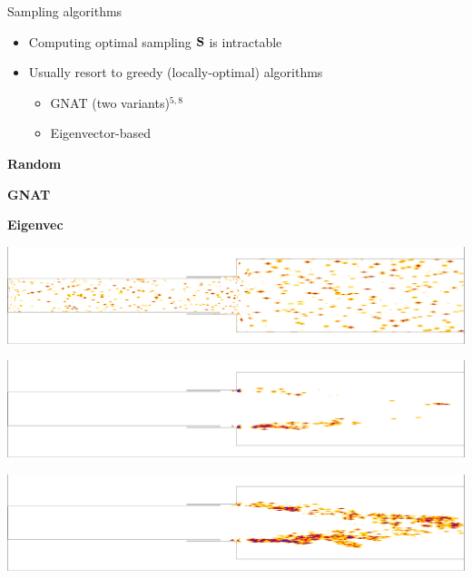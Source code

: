 \documentclass[]{beamer}
\begin{document}
\begin{frame}{Sampling algorithms}
    \begin{itemize}
		\item Computing optimal sampling $\mathbf{S}$ is intractable
		\item Usually resort to greedy (locally-optimal) algorithms
		\begin{itemize}
			\item GNAT (two variants)$^{5,8}$
			\item Eigenvector-based\footnotemark[8]
		\end{itemize}
	\end{itemize}
	\vspace{-1em}
	\begin{minipage}{0.13\linewidth}
		\footnotesize
		\vspace{3.9em}
		\textbf{Random}
		\normalsize

		\vspace{3em}

		\footnotesize
		\textbf{GNAT}

		\vspace{3.7em}

		\footnotesize
		\textbf{Eigenvec}

		\vspace{4em}
	\end{minipage}
	\centering
	\begin{minipage}{0.8\linewidth}%
		\includegraphics[width=0.85\linewidth,trim={0.2em 2em 0.3em 2em},clip]{Images/theory/iblanks/random_iblank_z.png}

		\includegraphics[width=0.85\linewidth,trim={0.2em 2em 0.3em 2em},clip]{Images/theory/iblanks/greedy_ben_iblank_z.png}

		\includegraphics[width=0.85\linewidth,trim={0.2em 2em 0.3em 2em},clip]{Images/theory/iblanks/eigenvec_iblank_z.png}
	\end{minipage}
	\vspace{-2em}
\end{frame}
\end{document}
